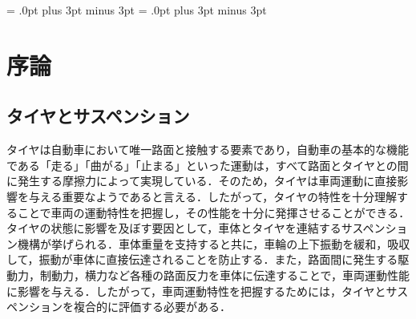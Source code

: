 \documentclass[a4paper,12pt]{article_vdlab_sotsuron}
\begin{document}
\kanjiskip = .0pt plus 3pt minus 3pt
\xkanjiskip = .0pt plus 3pt minus 3pt
\small
{}


\begin{center}
\end{center}

\tableofcontents


\newpage
\section{序論}
\subsection{タイヤとサスペンション}
タイヤは自動車において唯一路面と接触する要素であり，自動車の基本的な機能である「走る」「曲がる」「止まる」といった運動は，すべて路面とタイヤとの間に発生する摩擦力によって実現している．そのため，タイヤは車両運動に直接影響を与える重要なようであると言える．したがって，タイヤの特性を十分理解することで車両の運動特性を把握し，その性能を十分に発揮させることができる．タイヤの状態に影響を及ぼす要因として，車体とタイヤを連結するサスペンション機構が挙げられる．車体重量を支持すると共に，車輪の上下振動を緩和，吸収して，振動が車体に直接伝達されることを防止する．また，路面間に発生する駆動力，制動力，横力など各種の路面反力を車体に伝達することで，車両運動性能に影響を与える．したがって，車両運動特性を把握するためには，タイヤとサスペンションを複合的に評価する必要がある．
\end{document}
